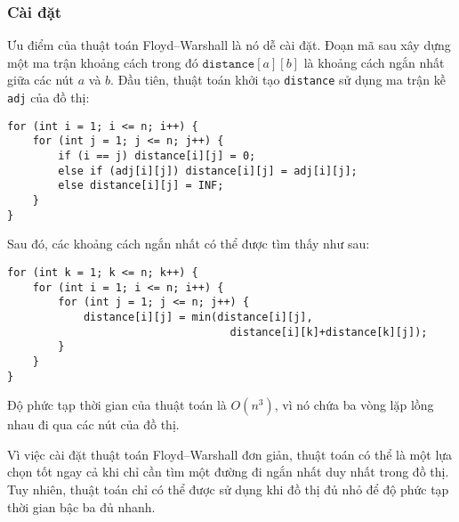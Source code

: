 \subsubsection{Cài đặt}

Ưu điểm của thuật toán
Floyd–Warshall là nó
dễ cài đặt.
Đoạn mã sau xây dựng một
ma trận khoảng cách trong đó $\texttt{distance}[a][b]$
là khoảng cách ngắn nhất giữa các nút $a$ và $b$.
Đầu tiên, thuật toán khởi tạo \texttt{distance}
sử dụng ma trận kề \texttt{adj} của đồ thị:

\begin{lstlisting}
for (int i = 1; i <= n; i++) {
    for (int j = 1; j <= n; j++) {
        if (i == j) distance[i][j] = 0;
        else if (adj[i][j]) distance[i][j] = adj[i][j];
        else distance[i][j] = INF;
    }
}
\end{lstlisting}
Sau đó, các khoảng cách ngắn nhất có thể được tìm thấy như sau:
\begin{lstlisting}
for (int k = 1; k <= n; k++) {
    for (int i = 1; i <= n; i++) {
        for (int j = 1; j <= n; j++) {
            distance[i][j] = min(distance[i][j],
                                   distance[i][k]+distance[k][j]);
        }
    }
}
\end{lstlisting}

Độ phức tạp thời gian của thuật toán là $O(n^3)$,
vì nó chứa ba vòng lặp lồng nhau
đi qua các nút của đồ thị.

Vì việc cài đặt thuật toán Floyd–Warshall
đơn giản, thuật toán có thể là
một lựa chọn tốt ngay cả khi chỉ cần tìm một
đường đi ngắn nhất duy nhất trong đồ thị.
Tuy nhiên, thuật toán chỉ có thể được sử dụng khi đồ thị
đủ nhỏ để độ phức tạp thời gian bậc ba đủ nhanh.
